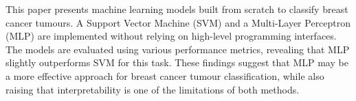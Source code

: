 This paper presents machine learning models built from scratch to classify breast cancer tumours. A Support Vector Machine (SVM) and a Multi-Layer Perceptron (MLP) are implemented without relying on high-level programming interfaces. The models are evaluated using various performance metrics, revealing that MLP slightly outperforms SVM for this task. These findings suggest that MLP may be a more effective approach for breast cancer tumour classification, while also raising that interpretability is one of the limitations of both methods. 